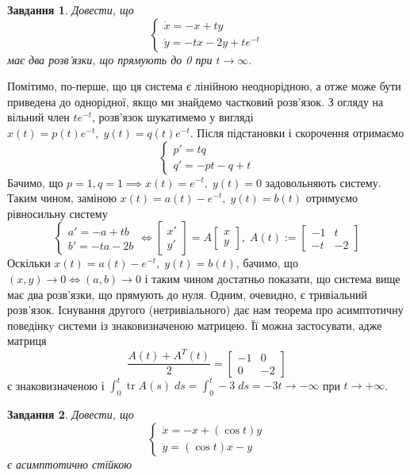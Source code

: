 \documentclass[10pt]{article}
\title{}
\author{}
\newtheorem{prob}{Завдання}
\begin{document}
\maketitle
\begin{prob}Довести, що
\[\begin{cases}\dot{x}=-x+ty\\\dot{y}=-tx-2y+te^{-t}\end{cases}\]
має два розв’язки, що прямують до 0 при $t\to\infty$.
\end{prob}
Помітимо, по-перше, що ця система є лінійною неоднорідною, а отже може бути приведена до однорідної, якщо ми знайдемо частковий розв’язок. З огляду
на вільний член $te^{-t}$, розв’язок шукатимемо у вигляді $x(t)=p(t)e^{-t},\;y(t)=q(t)e^{-t}$. Після підстановки і скорочення отримаємо
\[\begin{cases}p'=tq\\q'=-pt-q+t\end{cases}\]
Бачимо, що $p=1,q=1\implies x(t)=e^{-t},\;y(t)=0$ задовольняють систему. Таким чином, заміною $x(t)=a(t)-e^{-t},\;y(t)=b(t)$ отримуємо рівносильну
систему
\[\begin{cases}a'=-a+tb\\b'=-ta-2b\end{cases}\iff \begin{bmatrix}x'\\y'\end{bmatrix}=A\begin{bmatrix}x\\y\end{bmatrix},\;A(t):=\begin{bmatrix}
-1&t\\-t&-2\end{bmatrix}\]
Оскільки $x(t)=a(t)-e^{-t},\;y(t)=b(t)$, бачимо, що $(x,y)\to0\iff (a,b)\to0$ і таким чином достатньо показати, що система вище має два
розв’язки, що прямують до нуля. Одним, очевидно, є тривіальний розв’язок. Існування другого (нетривіального) дає нам теорема про асимптотичну
поведінкy системи із знаковизначеною матрицею. Її можна застосувати, адже матриця
\[\frac{A(t)+A^T(t)}{2}=\begin{bmatrix}-1&0\\0&-2\end{bmatrix}\]
є знаковизначеною і $\int_0^t\operatorname{tr}A(s)\;ds=\int_0^t-3\;ds=-3t\to-\infty$ при $t\to+\infty$.
\begin{prob}Довести, що
\[\begin{cases}\dot{x}=-x+(\cos t)y\\\dot{y}=(\cos t)x-y\end{cases}\] є асимптотично стійкою
\end{prob}
\end{document}
